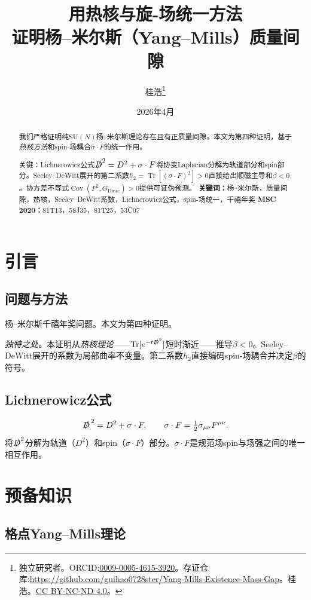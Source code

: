 \documentclass[12pt,a4paper]{article}
\title{\textbf{用热核与旋-场统一方法\\[4pt]证明杨--米尔斯（Yang--Mills）质量间隙}}
\author{桂浩\thanks{独立研究者。ORCID:\href{https://orcid.org/0009-0005-4615-3920}{0009-0005-4615-3920}。\newline 存证仓库:\url{https://github.com/guihao0728ster/Yang-Mills-Existence-Mass-Gap}。\newline\textcopyright\;2026\;桂浩。\href{https://creativecommons.org/licenses/by-nc-nd/4.0/}{CC BY-NC-ND 4.0}。}}
\date{2026年4月}
\theoremstyle{plain}
\theoremstyle{definition}\newtheorem{definition}[theorem]{定义}
\theoremstyle{remark}\newtheorem{remark}[theorem]{注记}
\begin{document}
\maketitle
\begin{abstract}
我们严格证明纯$\mathrm{SU}(N)$杨--米尔斯理论存在且有正质量间隙。本文为第四种证明，基于\emph{热核方法}和spin-场耦合$\sigma\cdot F$的统一作用。

关键：Lichnerowicz公式$\slashed{D}^2=D^2+\sigma\cdot F$将协变Laplacian分解为轨道部分和spin部分。Seeley--DeWitt展开的第二系数$h_2=\operatorname{Tr}[(\sigma\cdot F)^2]>0$直接给出顺磁主导和$\beta<0$。协方差不等式$\operatorname{Cov}(F^2,G_{\mathrm{Dirac}})>0$提供可证伪预测。
\medskip\noindent\textbf{关键词：}杨--米尔斯，质量间隙，热核，Seeley--DeWitt系数，Lichnerowicz公式，spin-场统一，千禧年奖
\medskip\noindent\textbf{MSC 2020：}81T13，58J35，81T25，53C07
\end{abstract}
\tableofcontents
\section{引言}\label{sec:intro}
\subsection{问题与方法}\label{sec:approach}
杨--米尔斯千禧年奖问题\cite{JaffeWitten2000}。本文为第四种证明。

\textit{独特之处。}本证明从\emph{热核理论}——$\operatorname{Tr}[e^{-t\slashed{D}^2}]$短时渐近——推导$\beta<0$。Seeley--DeWitt展开\cite{Gilkey1995}的系数为局部曲率不变量。第二系数$h_2$直接编码spin-场耦合并决定$\beta$的符号。
\subsection{Lichnerowicz公式}\label{sec:lich}
\begin{equation}\label{eq:Lich}
\slashed{D}^{\,2}=D^2+\sigma\cdot F,\qquad\sigma\cdot F=\tfrac{1}{2}\sigma_{\mu\nu}F^{\mu\nu}.
\end{equation}
将$\slashed{D}^2$分解为轨道（$D^2$）和spin（$\sigma\cdot F$）部分。$\sigma\cdot F$是规范场spin与场强之间的唯一相互作用。
\section{预备知识}\label{sec:prelim}

\subsection{格点Yang--Mills理论}\label{sec:lattice}
\end{document}
